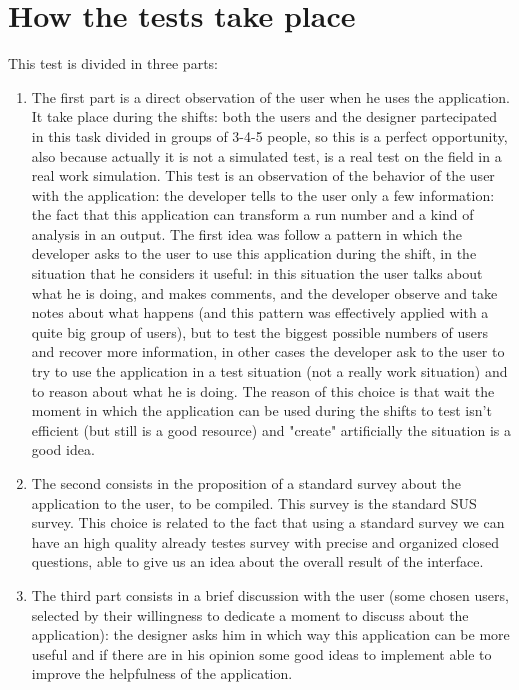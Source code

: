 \section{How the tests take place} 

This test is divided in three parts: 
\begin{enumerate}
\item
The first part is a direct observation of the user when he uses the application. It take place during the shifts: both the users and the designer partecipated in this task divided in groups of 3-4-5 people, so this is a perfect opportunity, also because actually it is not a simulated test, is a real test on the field in a real work simulation. This test is an observation of the behavior of the user with the application: the developer tells to the user only a few information: the fact that this application can transform a run number and a kind of analysis in an output. 
The first idea was follow a pattern in which the developer asks to the user to use this application during the shift, in the situation that he considers it useful: in this situation the user talks about what he is doing, and makes comments, and the developer observe and take notes about what happens (and this pattern was effectively applied with a quite big group of users), but to test the biggest possible numbers of users and recover more information, in other cases the developer ask to the user to try to use the application in a test situation (not a really work situation) and to reason about what he is doing. The reason of this choice is that wait the moment in which the application can be used during the shifts to test isn't efficient (but still is a good resource) and "create" artificially the situation is a good idea.

\item
The second consists in the proposition of a standard survey about the application to the user, to be compiled. This survey is the standard SUS survey. This choice is related to the fact that using a standard survey we can have an high quality already testes survey with precise and organized closed questions, able to give us an idea about the overall result of the interface. 
\item 
The third part consists in a brief discussion with the user (some chosen users, selected by their willingness to dedicate a moment to discuss about the application): the designer asks him in which way this application can be more useful and if there are in his opinion some good ideas to implement able to improve the helpfulness of the application.

\end{enumerate} 

